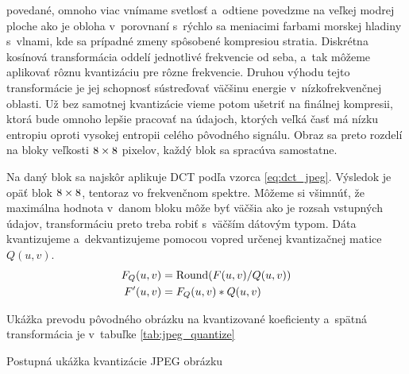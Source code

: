 povedané, omnoho viac vnímame svetlosť a~odtiene povedzme na veľkej
modrej ploche ako je obloha v~porovnaní s~rýchlo sa meniacimi farbami
morskej hladiny s~vlnami, kde sa prípadné zmeny spôsobené kompresiou
stratia. Diskrétna kosínová transformácia oddelí
jednotlivé frekvencie od seba, a~tak môžeme aplikovať rôznu
kvantizáciu pre rôzne frekvencie. Druhou výhodu tejto transformácie je
jej schopnosť sústreďovať väčšinu energie v~nízkofrekvenčnej oblasti.
Už bez samotnej kvantizácie vieme potom ušetriť na finálnej kompresii,
ktorá bude omnoho lepšie pracovať na údajoch, ktorých veľká časť má
nízku entropiu oproti vysokej entropii celého pôvodného signálu.
Obraz sa preto rozdelí na bloky veľkosti $8\times8$ pixelov, každý blok sa
spracúva samostatne.

Na daný blok sa najskôr aplikuje DCT podľa vzorca \ref{eq:dct_jpeg}.
Výsledok je opäť blok $8\times8$,
tentoraz vo frekvenčnom spektre. Môžeme si všimnúť, že maximálna
hodnota v~danom bloku môže byť väčšia ako je rozsah vstupných údajov,
transformáciu preto treba robiť s~väčším dátovým typom.
Dáta kvantizujeme a~dekvantizujeme pomocou vopred určenej kvantizačnej matice $Q(u,v)$.
\begin{align*}
    F_Q(u,v) &= {\rm Round} (F(u,v)/Q(u,v)) \\
    F'(u,v) &= F_Q(u,v) * Q(u,v)
\end{align*}

Ukážka prevodu pôvodného obrázku na kvantizované koeficienty 
a~spätná transformácia je v~tabuľke \ref{tab:jpeg_quantize}

\begin{table}[htb]
    \centering

    \subtable[DCT]{
    \tiny
    
    }

    \subtable[Po kvantizácii]{
    \tiny
    
    }
    
    \subtable[Dekvantizácia]{
    \tiny
    
    }
    
    
    \caption{Postupná ukážka kvantizácie JPEG obrázku}
    \label{tab:jpeg_quantize}
\end{table}

